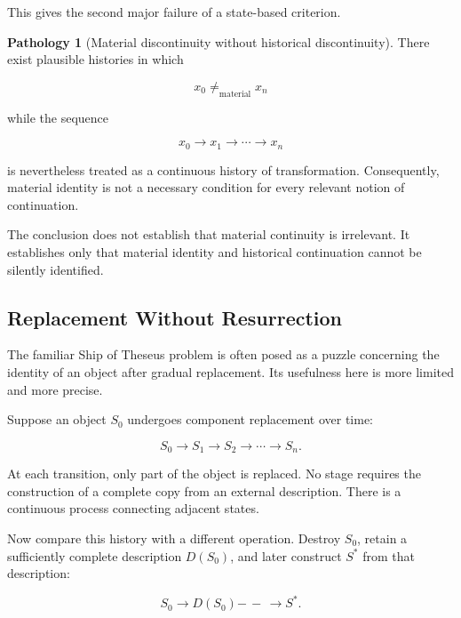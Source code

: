 \documentclass[
  11pt,
  a4paper,
  DIV=12,
  BCOR=0mm,
  parskip=half-
]{scrartcl}
\newcommand{\dashrightarrow}{\mathrel{{-}\,{-}\,{\to}}}
\theoremstyle{definition}
\newtheorem{pathology}[definition]{Pathology}
\theoremstyle{plain}
\theoremstyle{remark}
\begin{document}
This gives the second major failure of a state-based criterion.

\begin{pathology}[Material discontinuity without historical discontinuity]
\label{path:material-discontinuity}
There exist plausible histories in which

\[
  x_0\neq_{\mathrm{material}}x_n
\]

while the sequence

\[
  x_0
  \longrightarrow
  x_1
  \longrightarrow
  \cdots
  \longrightarrow
  x_n
\]

is nevertheless treated as a continuous history of transformation.
Consequently, material identity is not a necessary condition for every
relevant notion of continuation.
\end{pathology}

The conclusion does not establish that material continuity is irrelevant.
It establishes only that material identity and historical continuation cannot
be silently identified.


\subsection{Replacement Without Resurrection}
\label{sec:replacement}

The familiar Ship of Theseus problem is often posed as a puzzle concerning the
identity of an object after gradual replacement. Its usefulness here is more
limited and more precise.

Suppose an object \(S_0\) undergoes component replacement over time:

\[
  S_0
  \longrightarrow
  S_1
  \longrightarrow
  S_2
  \longrightarrow
  \cdots
  \longrightarrow
  S_n.
\]

At each transition, only part of the object is replaced. No stage requires the
construction of a complete copy from an external description. There is a
continuous process connecting adjacent states.

Now compare this history with a different operation. Destroy \(S_0\), retain
a sufficiently complete description \(D(S_0)\), and later construct \(S^\ast\)
from that description:

\[
  S_0
  \longrightarrow
  D(S_0)
  \dashrightarrow
  S^\ast.
\]
\end{document}

